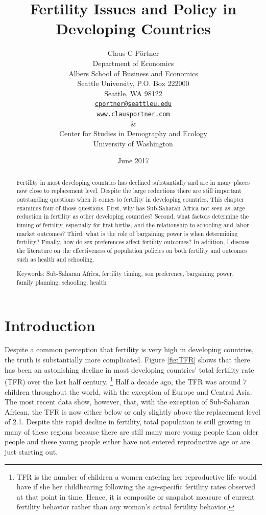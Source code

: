 \documentclass[letterpaper,12pt]{article}
\title{Fertility Issues and Policy in Developing Countries}
\author{Claus C P\"ortner\\
    Department of Economics\\
    Albers School of Business and Economics\\
    Seattle University, P.O. Box 222000\\
    Seattle, WA 98122\\
    \href{mailto:cportner@seattleu.edu}{\texttt{cportner@seattleu.edu}}\\
    \href{http://www.clausportner.com}{\texttt{www.clausportner.com}}\\
    \& \\
    Center for Studies in Demography and Ecology \\
    University of Washington\\ \vspace{2cm}
    }
\date{June 2017}
\begin{document}
\maketitle
\thispagestyle{empty}

\begin{abstract}

Fertility in most developing countries has declined substantially 
and are in many places now close to replacement level.
Despite the large reductions there are still important outstanding 
questions when it comes to fertility in developing countries.
This chapter examines four of those questions.
First, why has Sub-Saharan Africa not seen as large reduction in 
fertility as other developing countries?
Second, what factors determine the timing of fertility, especially
for first births, and the relationship to schooling and labor
market outcomes?
Third, what is the role of bargaining power is when determining
fertility?
Finally, how do sex preferences affect fertility outcomes?
In addition, I discuss the literature on the effectiveness 
of population policies on both fertility and outcomes such
as health and schooling.

\noindent Keywords: Sub-Saharan Africa, fertility timing, son preference, 
bargaining power, family planning, schooling, health

\end{abstract}

\newpage 

\doublespacing

\section{Introduction}

Despite a common perception that fertility is very high in developing
countries, the truth is substantially more complicated.
Figure \ref{fig:TFR} shows that there has been an astonishing decline in
most developing countries' total fertility rate (TFR) over the last half
century.%
\footnote{
TFR is the number of children a women entering her reproductive life
would have if she her childbearing following the age-specific fertility
rates observed at that point in time.
Hence, it is composite or snapshot measure of current fertility
behavior rather than any woman's actual fertility behavior.}
Half a decade ago, the TFR was around 7 children throughout the world,
with the exception of Europe and Central Asia.
The most recent data show, however, that, with the exception of
Sub-Saharan African, the TFR is now either below or only slightly above
the replacement level of 2.1.
Despite this rapid decline in fertility, total population is still
growing in many of these regions because there are still many more young
people than older people and these young people either have not entered
reproductive age or are just starting out.
\end{document}
